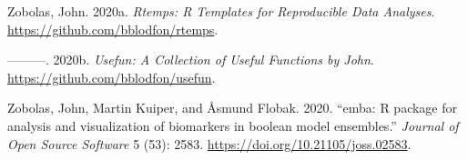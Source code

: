 \documentclass[
  12pt,
]{book}
\newlength{\cslhangindent}
\newenvironment{cslreferences}%
  {\setlength{\parindent}{0pt}%
  \everypar{\setlength{\hangindent}{\cslhangindent}}\ignorespaces}%
  {\par}
\begin{document}
\begin{cslreferences}
\leavevmode\hypertarget{ref-R-rtemps}{}%
Zobolas, John. 2020a. \emph{Rtemps: R Templates for Reproducible Data Analyses}. \url{https://github.com/bblodfon/rtemps}.

\leavevmode\hypertarget{ref-R-usefun}{}%
---------. 2020b. \emph{Usefun: A Collection of Useful Functions by John}. \url{https://github.com/bblodfon/usefun}.

\leavevmode\hypertarget{ref-Zobolas2020}{}%
Zobolas, John, Martin Kuiper, and Åsmund Flobak. 2020. ``emba: R package for analysis and visualization of biomarkers in boolean model ensembles.'' \emph{Journal of Open Source Software} 5 (53): 2583. \url{https://doi.org/10.21105/joss.02583}.
\end{cslreferences}
\end{document}
